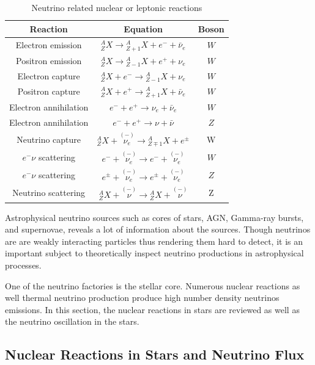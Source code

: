 \documentclass[%
 aip,
 jmp,%
 amsmath,amssymb,
 reprint,%
]{revtex4-1}
\begin{document}
\begin{table}[ht]
\centering
 \begin{tabular}{|c | c | c|} 
 \hline
 Reaction & Equation & Boson   \\ [0.5ex] 
 \hline
 Electron emission & ${}^A_Z X \to {}^A_{Z+1}X + e^- +\bar \nu_e$ & $W$  \\ 
 Positron emission & ${}^A_Z X \to {}^A_{Z-1}X + e^+ + \nu_e$ & $W$  \\
 Electron capture & ${}^A_Z X + e^- \to {}^A_{Z-1}X  + \nu_e$ &  $W$ \\
 Positron capture & ${}^A_Z X + e^+ \to {}^A_{Z+1}X  + \bar\nu_e$ &  $W$ \\
 [0.5ex] 
 \hline

 Electron annihilation &  $e^- + e^+  \to \nu_e + \bar\nu_e $  & $W$ \\
 Electron annihilation &  $e^- + e^+  \to \nu + \bar\nu $  & $Z$ \\
 [0.5ex] 
 \hline

  Neutrino capture & ${}^A_{Z}X + \overset{(-)}{\nu_e} \to {}^A_{Z\mp 1}X + e^\pm $ & W\\
  [1ex] 
 \hline
 $e^-\nu$ scattering & $e^- + \overset{(-)}{\nu_e} \to e^- + \overset{(-)}{\nu_e} $ &  $W$ \\
 $e^-\nu$ scattering & $e^{\pm} + \overset{(-)}{\nu_e} \to e^{\pm} + \overset{(-)}{\nu_e} $ &  $Z$ \\
 Neutrino scattering & $ {}^A_Z X + \overset{(-)}{\nu} \to {}^A_Z X + \overset{(-)}{\nu} $ &  Z\\
 [0.5ex] 
 \hline
 \end{tabular}
 \caption{Neutrino related nuclear or leptonic reactions}
\label{table:Neutrino_Reactions}
\end{table}

Astrophysical neutrino sources such as cores of stars, AGN, Gamma-ray bursts, and supernovae, reveals a lot of information about the sources. Though neutrinos are are weakly interacting particles thus rendering them hard to detect, it is an important subject to theoretically inspect neutrino productions in astrophysical processes.

One of the neutrino factories is the stellar core. Numerous nuclear reactions as well thermal neutrino production produce high number density neutrinos emissions. In this section, the nuclear reactions in stars are reviewed as well as the neutrino oscillation in the stars.



\subsection{Nuclear Reactions in Stars and Neutrino Flux}
\end{document}
